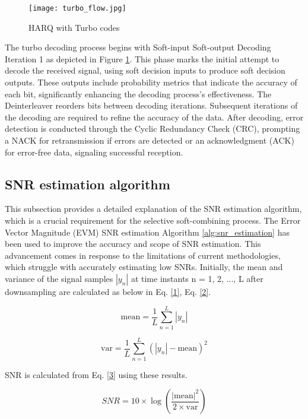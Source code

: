 \documentclass[sn-mathphys-num]{sn-jnl}
\theoremstyle{thmstyleone}
\theoremstyle{thmstyletwo}%
\theoremstyle{thmstylethree}%
\begin{document}
\begin{figure}[H]
    \centering
    \texttt{[image: turbo\_flow.jpg]}
    \caption{HARQ with Turbo codes}
    \label{fig:15}
\end{figure}

The turbo decoding process begins with Soft-input Soft-output Decoding Iteration 1 as depicted in Figure \ref{fig:15}. This phase marks the initial attempt to decode the received signal, using soft decision inputs to produce soft decision outputs. These outputs include probability metrics that indicate the accuracy of each bit, significantly enhancing the decoding process's effectiveness. The Deinterleaver reorders bits between decoding iterations. Subsequent iterations of the decoding are required to refine the accuracy of the data. After decoding, error detection is conducted through the Cyclic Redundancy Check (CRC), prompting a NACK for retransmission if errors are detected or an acknowledgment (ACK) for error-free data, signaling successful reception. 

\subsection{SNR estimation algorithm } \label{s3.1}

This subsection provides a detailed explanation of the SNR estimation algorithm, which is a crucial requirement for the selective soft-combining process. The Error Vector Magnitude (EVM) SNR estimation Algorithm \ref{alg:snr_estimation} has been used to improve the accuracy and scope of SNR estimation. This advancement comes in response to the limitations of current methodologies, which struggle with accurately estimating low SNRs. Initially, the mean and variance of the signal samples $|y_n|$ at time instants n = 1, 2, ..., L after downsampling are calculated as below in Eq. \ref{1}, Eq. \ref{2}.

\begin{equation}\label{1} 
\text{mean} = \frac{1}{L} \sum_{n=1}^{L} |y_n|
\end{equation}

\begin{equation}\label{2} 
\text{var} = \frac{1}{L} \sum_{n=1}^{L}( |y_n| -\text{mean})^2
\end{equation}

SNR is calculated from Eq. \ref{3} using these results.

\begin{equation}\label{3} SNR = 10 \times \log\left(\frac{|\text{mean}|^2}{2 \times \text{var}}\right) \end{equation}
\end{document}
